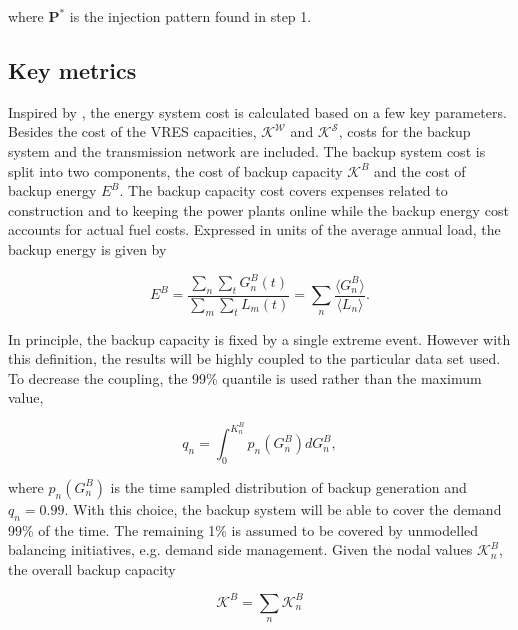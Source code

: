 \documentclass[a4paper, 5p, sort&compress]{elsarticle}%
\begin{document}
where $\mathbf{P}^{*}$ is the injection pattern found in step 1.


\subsection{Key metrics}

Inspired by \cite{Sensitivity}, the energy system cost is calculated
based on a few key parameters. Besides the cost of the VRES
capacities, $\mathcal{K^{W}}$ and $\mathcal{K^S}$, costs for the
backup system and the transmission network are included. The backup
system cost is split into two components, the cost of backup capacity
$\mathcal{K}^{B}$ and the cost of backup energy $E^{B}$. The backup
capacity cost covers expenses related to construction and to keeping
the power plants online while the backup energy cost accounts for
actual fuel costs. Expressed in units of the average annual load, the
backup energy is given by

\begin{equation}
  \label{eq:backup-energy}
  E^{B} =\frac{\sum_{n} \sum_{t} G^{B}_{n}(t)}{\sum_{m} \sum_{t}
    L_{m}(t)} = \sum_{n} \frac{\langle G^{B}_{n} \rangle}{\langle L_{n}
    \rangle} .
\end{equation}

In principle, the backup capacity is fixed by a single extreme
event. However with this definition, the results will be highly
coupled to the particular data set used. To decrease the coupling, the
99\% quantile is used rather than the maximum value,

\begin{equation}
  \label{eq:2}
  q_{n} = \int _{0} ^{K_{n}^{B}} p_{n}(G^{B}_{n})dG^{B}_{n},
\end{equation}

where $p_{n}(G^{B}_{n})$ is the time sampled distribution of backup
generation and $q_{n} = 0.99$. With this choice, the backup system
will be able to cover the demand 99\% of the time. The remaining 1\%
is assumed to be covered by unmodelled balancing initiatives,
e.g. demand side management. Given the nodal values
$\mathcal{K}^{B}_{n}$, the overall backup capacity

\begin{equation}
  \label{eq:4}
  \mathcal{K}^{B} = \sum_{n} \mathcal{K}^{B}_{n}
\end{equation}
\end{document}
